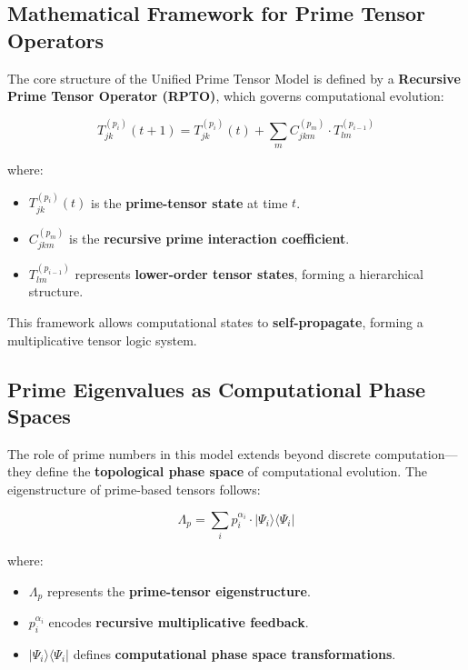 \documentclass{article}
\theoremstyle{plain}
\theoremstyle{plain}
\theoremstyle{definition}
\theoremstyle{remark}
\begin{document}
\subsection{Mathematical Framework for Prime Tensor Operators}

The core structure of the Unified Prime Tensor Model is defined by a \textbf{Recursive Prime Tensor Operator (RPTO)}, which governs computational evolution:

\begin{equation}
T_{jk}^{(p_i)}(t+1) = T_{jk}^{(p_i)}(t) + \sum_{m} C_{jkm}^{(p_m)} \cdot T_{lm}^{(p_{i-1})}
\end{equation}

where:
\begin{itemize}
    \item $T_{jk}^{(p_i)}(t)$ is the \textbf{prime-tensor state} at time $t$.
    \item $C_{jkm}^{(p_m)}$ is the \textbf{recursive prime interaction coefficient}.
    \item $T_{lm}^{(p_{i-1})}$ represents \textbf{lower-order tensor states}, forming a hierarchical structure.
\end{itemize}

This framework allows computational states to \textbf{self-propagate}, forming a multiplicative tensor logic system.

\subsection{Prime Eigenvalues as Computational Phase Spaces}

The role of prime numbers in this model extends beyond discrete computation—they define the \textbf{topological phase space} of computational evolution. The eigenstructure of prime-based tensors follows:

\begin{equation}
\Lambda_p = \sum_{i} p_i^{\alpha_i} \cdot |\Psi_i\rangle \langle \Psi_i |
\end{equation}

where:
\begin{itemize}
    \item $\Lambda_p$ represents the \textbf{prime-tensor eigenstructure}.
    \item $p_i^{\alpha_i}$ encodes \textbf{recursive multiplicative feedback}.
    \item $|\Psi_i\rangle \langle \Psi_i |$ defines \textbf{computational phase space transformations}.
\end{itemize}
\end{document}
